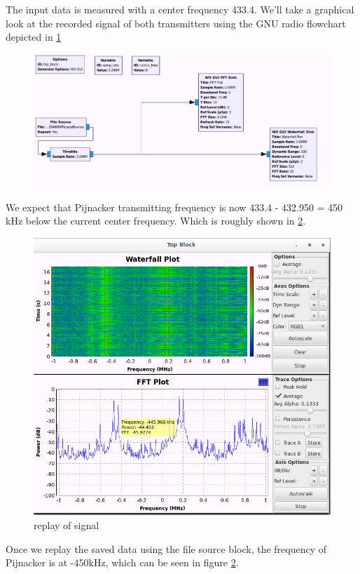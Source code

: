 The input data is measured with a center frequency 433.4. We'll take a graphical look at the recorded signal of both transmitters using the GNU radio flowchart depicted in \ref{fig:flowchart_play_from_file_grc}
\begin{figure}[h]
\centering
\includegraphics[width=0.7\linewidth]{figures/flowchart_play_from_file_grc}
\caption[gnu radio flowchart used to replay the captured data]{}

\label{fig:flowchart_play_from_file_grc}
\end{figure}

We expect that Pijnacker transmitting frequency is now 433.4 - 432.950 = 450 kHz below the current center frequency. Which is roughly shown in \ref{fig:gnuradio_waterfall_catpure_replay}. 

\begin{figure}[h]
\centering
\includegraphics[width=0.7\linewidth]{figures/gnuradio_waterfall_catpure_replay}
\caption{replay of signal}
\label{fig:gnuradio_waterfall_catpure_replay}
\end{figure}
 
Once we replay the saved data using the file source block, the frequency of Pijnacker is at -450kHz, which can be seen in figure \ref{fig:gnuradio_waterfall_catpure_replay}. 

